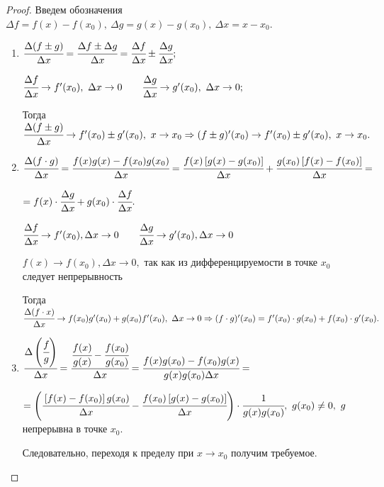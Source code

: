 \begin{proof}
	Введем обозначения $\Delta f = f (x) - f(x_{0}),\  \Delta g = g(x) - g(x_{0}),\  \Delta x = x - x_{0}$.
	\begin{enumerate}
		\item $\cfrac{\Delta(f \pm g)}{\Delta x} = \cfrac{\Delta f \pm \Delta g}{\Delta x} = \cfrac{\Delta f}{\Delta x} \pm \cfrac{\Delta g}{\Delta x};$
		
		$\cfrac{\Delta f}{\Delta x} \to f'(x_{0}),\  \Delta x \to 0 \quad \quad \cfrac{\Delta g}{\Delta x} \to g'(x_{0}),\  \Delta x \to 0;$
		
		Тогда $\cfrac{\Delta(f \pm g)}{\Delta x} \to f'(x_{0}) \pm g'(x_{0}), \ x \to x_{0} \Rightarrow (f \pm g)'(x_{0}) \to f'(x_{0}) \pm g'(x_{0}),\  x \to x_{0}.$
		
		\item $\cfrac{\Delta(f\cdot g)}{\Delta x} = \cfrac{f(x) g(x) - f(x_{0}) g(x_{0})}{\Delta x} = \cfrac{f(x) \left[  g(x) - g(x_{0}) \right]}{\Delta x} + \cfrac{g(x_{0}) \left[ f(x) - f(x_{0})\right]}{\Delta x} =$
		
		$= f(x) \cdot \cfrac{\Delta g}{\Delta x} + g(x_{0}) \cdot \cfrac{\Delta f}{\Delta x}.$
		
		$\cfrac{\Delta f}{\Delta x} \to f'(x_{0}), \Delta x \to 0 \quad \quad \cfrac{\Delta g}{\Delta x} \to g'(x_{0}), \Delta x \to 0$
		
		$f(x) \to f(x_{0}), \Delta x\to 0,$ так как из дифференцируемости в точке $x_{0}$ следует непрерывность
		
		Тогда $\cfrac{\Delta (f\cdot x)}{\Delta x} \to f(x_{0}) g'(x_{0}) + g(x_{0})f'(x_{0}),\  \Delta x \to 0 \Rightarrow (f \cdot g)'(x_{0}) = f'(x_{0}) \cdot g({x_{0}}) + f(x_{0}) \cdot g'({x_{0}}).$
		
		\item $\cfrac{\Delta \left(\cfrac{f}{g} \right)}{\Delta x} = \cfrac{\cfrac{f(x)}{g(x)} - \cfrac{f(x_{0})}{g(x_{0})}}{\Delta x} = \cfrac{f(x)g(x_{0}) - f(x_{0})g(x)}{g(x) g(x_{0}) \Delta x}= $
		
		$=\left(\cfrac{\left[f(x) - f(x_{0})\right] g(x_{0})}{\Delta x} - \cfrac{f(x_{0})\left[g(x) - g(x_{0})\right]}{\Delta x} \right) \cdot \cfrac{1}{g(x) g(x_{0})}, \ g(x_{0}) \neq 0, \  g$ непрерывна в точке $x_{0}.$
		
		Следовательно, переходя к пределу  при $x\to x_{0}$ получим требуемое. 
	\end{enumerate}
\end{proof}

